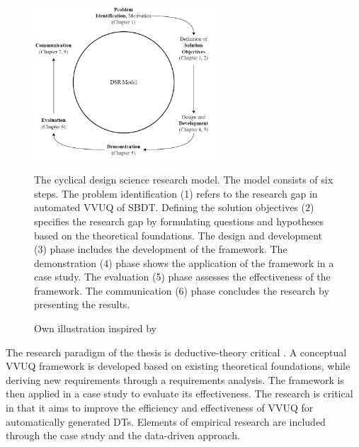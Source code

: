 \begin{figure}[H]
  \centering
  \includegraphics[width=0.6\textwidth]{figures/dsr.png}
  \caption[Design Science Methodology]{The cyclical design science research model. The model consists of six steps. The problem identification (1) refers to the research gap in automated VVUQ of SBDT. Defining the solution objectives (2) specifies the research gap by formulating questions and hypotheses based on the theoretical foundations. The design and development (3) phase includes the development of the framework. The demonstration (4) phase shows the application of the framework in a case study. The evaluation (5) phase assesses the effectiveness of the framework. The communication (6) phase concludes the research by presenting the results.}
  \label{fig:DSR}
  \caption*{Own illustration inspired by \textcite{peffers2007design}}
\end{figure}

The research paradigm of the thesis is deductive-theory critical \autocite{eberhard1987einfuhrung}. A conceptual VVUQ framework is developed based on existing theoretical foundations, while deriving new requirements through a requirements analysis. The framework is then applied in a case study to evaluate its effectiveness. The research is critical in that it aims to improve the efficiency and effectiveness of VVUQ for automatically generated DTs. Elements of empirical research are included through the case study and the data-driven approach.

